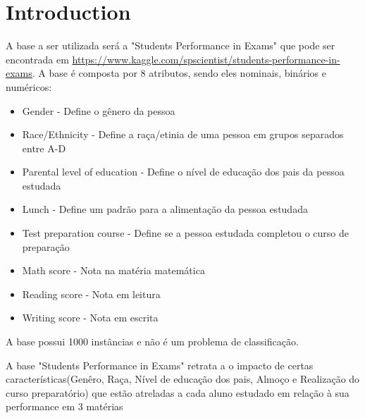 \documentclass[sigplan,screen]{acmart}
\begin{document}
\section{Introduction}
A base a ser utilizada será a "Students Performance in Exams" que pode ser encontrada em \url{https://www.kaggle.com/spscientist/students-performance-in-exams}. A base é composta por 8 atributos, sendo eles nominais, binários e numéricos:
\begin{itemize}
    \item Gender - Define o gênero da pessoa 
    \item Race/Ethnicity - Define a raça/etinia de uma pessoa em grupos separados entre A-D
    \item Parental level of education - Define o nível de educação dos pais da pessoa estudada
    \item Lunch - Define um padrão para a alimentação da pessoa estudada
    \item Test preparation course - Define se a pessoa estudada completou o curso de preparação
    \item Math score - Nota na matéria matemática
    \item Reading score - Nota em leitura
    \item Writing score - Nota em escrita
\end{itemize}

A base possui 1000 instâncias e não é um problema de classificação.

A base "Students Performance in Exams" retrata a o impacto de certas características(Genêro, Raça, Nível de educação dos pais, Almoço e Realização do curso preparatório) que estão atreladas a cada aluno estudado em relação à sua performance em 3 matérias










\end{document}
